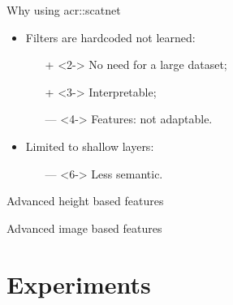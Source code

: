 \documentclass[12pt]{beamer}
\begin{document}
            \begin{frame}{Why using \texorpdfstring{\acrshort*{acr::scatnet}}{ScatNet}}
                \begin{itemize}[label=\(\blacktriangleright\), font=\color{IGNGreen}]
                    \item<1-> Filters are hardcoded not learned:
                    \begin{itemize}
                        \item[\color{IGNDarkGreen} +]<2-> No need for a large dataset;
                        \item[\color{IGNDarkGreen} +]<3-> Interpretable; 
                        \item[\color{red} ---]<4-> Features: not adaptable.
                    \end{itemize}
                    \item<5-> Limited to shallow layers:
                    \begin{itemize}
                        \item[\color{red} ---]<6-> Less semantic.
                    \end{itemize}
                \end{itemize}
            \end{frame}

            \begin{frame}{Advanced height based features}
                \centering
                
            \end{frame}

            \begin{frame}{Advanced image based features}
                \centering
                
            \end{frame}

    \section{Experiments}
\end{document}
